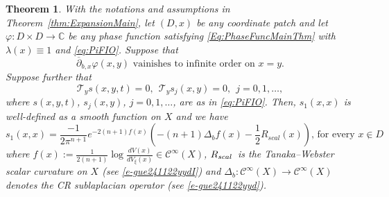 \documentclass[12pt]{amsart}
\newtheorem{theorem}{Theorem}[section]
\theoremstyle{definition}
\theoremstyle{named}
\numberwithin{equation}{subsection}
\newcommand{\C}{\mathbb{C}}
\newcommand{\ddbar}{\overline\partial}
\def\cC{\mathscr{C}}
\begin{document}
\begin{theorem}\label{t-gue241122yyd} 
With the notations and assumptions in Theorem~\ref{thm:ExpansionMain}, let $(D,x)$ be any coordinate patch and let 
$\varphi:D\times D\to\C$ be any phase function satisfying 
\eqref{Eq:PhaseFuncMainThm} with $\lambda(x)\equiv1$ and \eqref{eq:PiFIO}. Suppose that 
\begin{equation}\label{e-gue241120yydz}
\mbox{$\ddbar_{b,x}\varphi(x,y)$ vainishes to infinite order on $x=y$}.
\end{equation}
Suppose further that
\begin{equation}\label{e-gue241120ycdazz}
\mathcal{T}_ys(x,y,t)=0, \ \ \mathcal{T}_ys_j(x,y)=0,\ \ j=0,1,\ldots,
\end{equation}
where $s(x,y,t)$, $s_j(x,y)$, $j=0,1,\ldots$, are as in \eqref{eq:PiFIO}. Then, $s_1(x,x)$ is well-defined as a smooth function on $X$ and we have 
\begin{equation}\label{e-gue201221yydbz}
\mbox{$s_1(x,x)=\frac{-1}{2\pi^{n+1}}e^{-2(n+1)f(x)}\left(-(n+1)\Delta_b f(x)-\frac{1}{2}R_{scal}(x)\right)$,  for every $x\in D$}, 
\end{equation}
where $f(x):=\frac{1}{2(n+1)}\log \frac{dV(x)}{dV_\xi(x)}\in\cC^\infty(X)$, $R_{{\rm scal\,}}$ is the Tanaka--Webster scalar curvature on $X$ (see \eqref{e-gue241122yydI}) and $\Delta_b:\cC^{\infty}(X)\rightarrow\cC^{\infty}(X)$ denotes the CR sublaplacian operator (see \eqref{e-gue241122yyd}). 
\end{theorem} 
\end{document}
